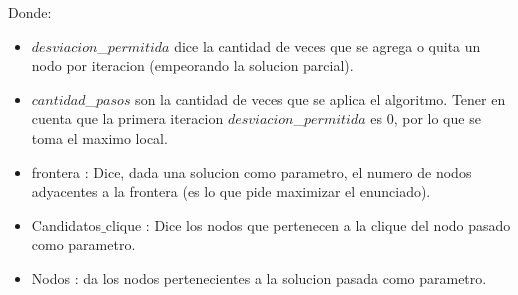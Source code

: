 Donde:
\begin{itemize}
 \item $desviacion$\_$permitida$ dice la cantidad de veces que se agrega o quita un nodo por iteracion (empeorando la solucion parcial).
 \item $cantidad$\_$pasos$ son la cantidad de veces que se aplica el algoritmo. Tener en cuenta que la primera iteracion $desviacion$\_$permitida$ es 0, por lo que se toma el maximo local.
 \item frontera : Dice, dada una solucion como parametro, el numero de nodos adyacentes a la frontera (es lo que pide maximizar el enunciado).
 \item Candidatos$\_$clique : Dice los nodos que pertenecen a la clique del nodo pasado como parametro.
 \item Nodos : da los nodos pertenecientes a la solucion pasada como parametro.
\end{itemize}
